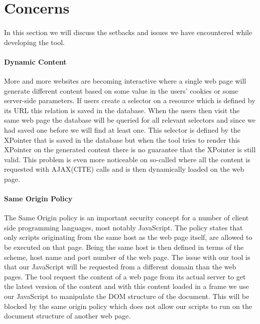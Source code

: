 	\section{Concerns} \label{sec:Concerns}
		\paragraph{}
		In this section we will discuss the setbacks and issues we have encountered while developing the tool.
		\paragraph{Dynamic Content}
		More and more websites are becoming interactive where a single web page will generate different content based on some value in the users' cookies or some server-side parameters. If users create a selector on a resource which is defined by its URL this relation is saved in the database. When the users then visit the same web page the database will be queried for all relevant selectors and since we had saved one before we will find at least one. This selector is defined by the XPointer that is saved in the database but when the tool tries to render this XPointer on the generated content there is no guarantee that the XPointer is still valid. This problem is even more noticeable on so-called  where all the content is requested with AJAX(CITE) calls and is then dynamically loaded on the web page.
		\paragraph{Same Origin Policy}
		The Same Origin policy is an important security concept for a number of client side programming languages, most notably JavaScript. The policy states that only scripts originating from the same host as the web page itself, are allowed to be executed on that page. Being the same host is then defined in terms of the scheme, host name and port number of the web page. The issue with our tool is that our JavaScript will be requested from a different domain than the web pages. The tool request the content of a web page from its actual server to get the latest version of the content and with this content loaded in a frame we use our JavaScript to manipulate the DOM structure of the document. This will be blocked by the same origin policy which does not allow our scripts to run on the document structure of another web page.
